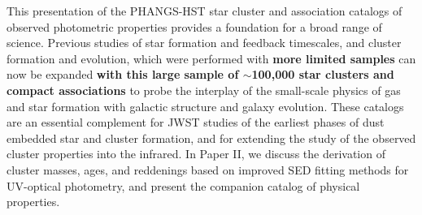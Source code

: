 \documentclass[linenumbers]{aastex63}
\begin{document}
\begin{enumerate}

\end{enumerate}

This presentation of the PHANGS-HST star cluster and association catalogs of observed photometric properties provides a foundation for a broad range of science. Previous studies of star formation and feedback timescales, and cluster formation and evolution, which were performed with \textbf{more limited samples} can now be expanded \textbf{with this large sample of $\sim$100,000 star clusters and compact associations} to probe the interplay of the small-scale physics of gas and star formation with galactic structure and galaxy evolution.  These catalogs are an essential complement for JWST studies of the earliest phases of dust embedded star and cluster formation, and for extending the study of the observed cluster properties into the infrared.  In Paper II, we discuss the derivation of cluster masses, ages, and reddenings based on improved SED fitting methods for UV-optical photometry, and present the companion catalog of physical properties.  





 

 
\end{document}
